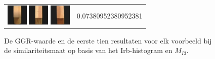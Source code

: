 \begin{figure}[tbp]
\begin{center}
\begin{tabular}{m{11cm} | m{3cm} |}
\includegraphics[width=1cm]{coil/beeld-2.eps}
\includegraphics[width=1cm]{coil/beeld-47.eps}
\includegraphics[width=1cm]{coil/beeld-44.eps}
& {\scriptsize 0.07380952380952381}
\\
\end{tabular}
\caption{\label{fig:results_irb_histgeb}De GGR-waarde en de eerste tien resultaten voor elk voorbeeld bij de similariteitsmaat op basis van het Irb-histogram en $M_{I3}$.}
\end{center}
\end{figure}

